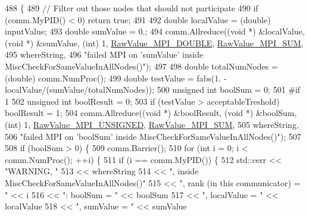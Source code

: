 \begin{DoxyCode}
488 \{
489   \textcolor{comment}{// Filter out those nodes that should not participate}
490   \textcolor{keywordflow}{if} (comm.MyPID() < 0) \textcolor{keywordflow}{return} \textcolor{keyword}{true};
491 
492   \textcolor{keywordtype}{double} localValue = (double) inputValue;
493   \textcolor{keywordtype}{double} sumValue = 0.;
494   comm.Allreduce((\textcolor{keywordtype}{void} *) &localValue, (\textcolor{keywordtype}{void} *) &sumValue, (\textcolor{keywordtype}{int}) 1, 
      \hyperlink{_mpi_comm_8h_ad0f503bd9fecfe4e570ca3d15aaf2518}{RawValue\_MPI\_DOUBLE}, \hyperlink{_mpi_comm_8h_afbf78d291c032aa7f512bc566cee2bd1}{RawValue\_MPI\_SUM},
495                  whereString,
496                  \textcolor{stringliteral}{"failed MPI on 'sumValue' inside MiscCheckForSameValueInAllNodes()"});
497 
498   \textcolor{keywordtype}{double} totalNumNodes = (double) comm.NumProc();
499   \textcolor{keywordtype}{double} testValue = fabs(1. - localValue/(sumValue/totalNumNodes));
500   \textcolor{keywordtype}{unsigned} \textcolor{keywordtype}{int} boolSum = 0;
501 \textcolor{preprocessor}{#if 1}
502 \textcolor{preprocessor}{}  \textcolor{keywordtype}{unsigned} \textcolor{keywordtype}{int} boolResult = 0;
503   \textcolor{keywordflow}{if} (testValue > acceptableTreshold) boolResult = 1;
504   comm.Allreduce((\textcolor{keywordtype}{void} *) &boolResult, (\textcolor{keywordtype}{void} *) &boolSum, (\textcolor{keywordtype}{int}) 1, 
      \hyperlink{_mpi_comm_8h_a06cbfbc33436f6e0dc8a48ff3c49bdfc}{RawValue\_MPI\_UNSIGNED}, \hyperlink{_mpi_comm_8h_afbf78d291c032aa7f512bc566cee2bd1}{RawValue\_MPI\_SUM},
505                  whereString,
506                  \textcolor{stringliteral}{"failed MPI on 'boolSum' inside MiscCheckForSameValueInAllNodes()"});
507 
508   \textcolor{keywordflow}{if} (boolSum > 0) \{
509     comm.Barrier();
510     \textcolor{keywordflow}{for} (\textcolor{keywordtype}{int} i = 0; i < comm.NumProc(); ++i) \{
511       \textcolor{keywordflow}{if} (i == comm.MyPID()) \{
512         std::cerr << \textcolor{stringliteral}{"WARNING, "}
513                   << whereString
514                   << \textcolor{stringliteral}{", inside MiscCheckForSameValueInAllNodes()"}
515                   << \textcolor{stringliteral}{", rank (in this communicator) = "} << i
516                   << \textcolor{stringliteral}{": boolSum = "}       << boolSum
517                   << \textcolor{stringliteral}{", localValue = "}    << localValue
518                   << \textcolor{stringliteral}{", sumValue = "}      << sumValue

\end{DoxyCode}
